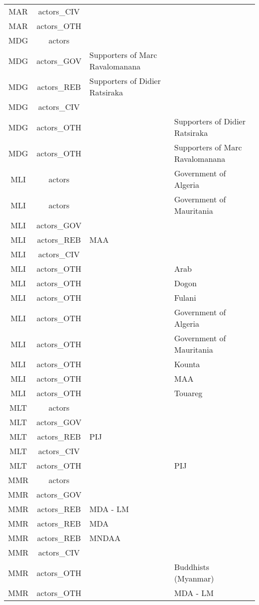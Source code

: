 \documentclass[12pt]{article}
\begin{document}
\begin{center}
\begin{longtable}{|c|c|p{7cm}|p{7cm}|}
  MAR & actors\_CIV &  &  \\ 
  MAR & actors\_OTH &  &  \\ 
  MDG & actors &  &  \\ 
  MDG & actors\_GOV & Supporters of Marc Ravalomanana &  \\ 
  MDG & actors\_REB & Supporters of Didier Ratsiraka &  \\ 
  MDG & actors\_CIV &  &  \\ 
  MDG & actors\_OTH &  & Supporters of Didier Ratsiraka \\ 
  MDG & actors\_OTH &  & Supporters of Marc Ravalomanana \\ 
  MLI & actors &  & Government of Algeria \\ 
  MLI & actors &  & Government of Mauritania \\ 
  MLI & actors\_GOV &  &  \\ 
  MLI & actors\_REB & MAA &  \\ 
  MLI & actors\_CIV &  &  \\ 
  MLI & actors\_OTH &  & Arab \\ 
  MLI & actors\_OTH &  & Dogon \\ 
  MLI & actors\_OTH &  & Fulani \\ 
  MLI & actors\_OTH &  & Government of Algeria \\ 
  MLI & actors\_OTH &  & Government of Mauritania \\ 
  MLI & actors\_OTH &  & Kounta \\ 
  MLI & actors\_OTH &  & MAA \\ 
  MLI & actors\_OTH &  & Touareg \\ 
  MLT & actors &  &  \\ 
  MLT & actors\_GOV &  &  \\ 
  MLT & actors\_REB & PIJ &  \\ 
  MLT & actors\_CIV &  &  \\ 
  MLT & actors\_OTH &  & PIJ \\ 
  MMR & actors &  &  \\ 
  MMR & actors\_GOV &  &  \\ 
  MMR & actors\_REB & MDA - LM &  \\ 
  MMR & actors\_REB & MDA &  \\ 
  MMR & actors\_REB & MNDAA &  \\ 
  MMR & actors\_CIV &  &  \\ 
  MMR & actors\_OTH &  & Buddhists (Myanmar) \\ 
  MMR & actors\_OTH &  & MDA - LM \\ 

\end{longtable}
\end{center}
\end{document}
